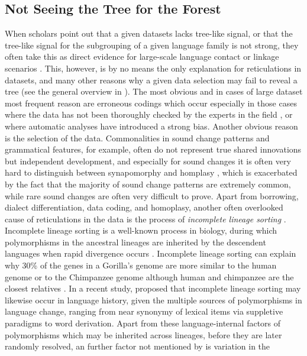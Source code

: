 \documentclass[svgnames,12pt]{scrartcl}
\begin{document}
{{\subsection{Not Seeing the Tree for the Forest}
When scholars point out that a given datasets lacks tree-like signal, or that the tree-like signal
for the subgrouping of a given language family is not strong, they often take this as direct
evidence for large-scale language contact or linkage scenarios \citep{Ross1988}.  This, however, is
by no means the only explanation for reticulations in datasets, and many other reasons why a given
data selection may fail to reveal a tree (see the general overview in
\citealt[44-66]{Morrison2011}). The most obvious and in cases of large dataset most frequent reason
are erroneous codings which occur especially in those cases where the data has not been thoroughly
checked by the experts in the field \citep{Geisler2010}, or where automatic analyses have introduced
a strong bias. Another obvious reason is the selection of the data. Commonalities in sound change
patterns and grammatical features, for example, often do not represent true shared innovations but
independent development, and especially for sound changes it is often very hard to distinguish
between synapomorphy and homplasy \citep[182f]{Chacon2015}, which is exacerbated by the fact that
the majority of sound change patterns are extremely common, while rare sound changes are often very
difficult to prove. Apart from borrowing, dialect differentiation, data coding, and homoplasy,
another often overlooked cause of reticulations in the data is the process of \emph{incomplete
lineage sorting} \citep{Galtier2008}. Incomplete lineage sorting is a well-known process in
biology, during which polymorphisms in the ancestral lineages are inherited by the descendent
languages when rapid divergence occurs \citep{Rogers2014}. Incomplete lineage sorting can explain 
why 30\% of the genes in a Gorilla's genome are more similar to the human genome or to the
Chimpanzee genome although human and chimpanzee are the closest relatives \citep{Scally2012}. 
In a recent study, \citet{List2016h} proposed that incomplete lineage sorting may likewise occur in
language history, given  
the multiple sources of polymorphisms in language change, ranging from near synonymy of lexical
items via suppletive paradigms to word derivation.
Apart from these language-internal factors of polymorphisms which may be inherited across lineages,
before they are
later randomly resolved, an further factor not mentioned by \citet{List2016h} is variation in the
}}
\end{document}
